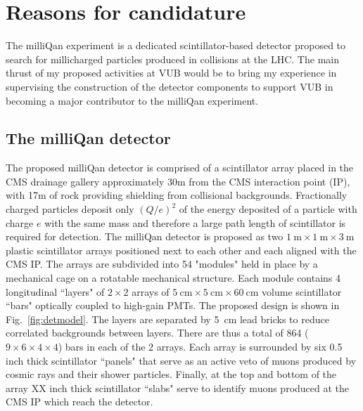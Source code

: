 \documentclass[11pt]{article}
\theoremstyle{plain} \numberwithin{equation}{section}
\theoremstyle{definition}
\begin{document}
\section*{Reasons for candidature}
\noindent 

The milliQan experiment is a dedicated scintillator-based detector
proposed to search for millicharged particles produced in collisions
at the LHC. The main thrust of my proposed activities at VUB 
would be to bring my experience in supervising the construction of the detector components
to support VUB in becoming a major contributor to the milliQan experiment.

\subsection*{The milliQan detector}

The proposed milliQan detector is comprised of a scintillator array placed in
the CMS drainage gallery approximately 30m from the CMS interaction point (IP), 
with 17m of rock providing shielding from collisional backgrounds. Fractionally charged particles 
deposit only $(Q/e)^2$ of the energy deposited of a particle with charge $e$ with 
the same mass and therefore a large path length of scintillator is required for
detection. The milliQan detector is proposed as two 
$1~\mathrm{m}\times1~\mathrm{m}\times3~\mathrm{m}$ plastic scintillator arrays 
positioned next to each other and each aligned with the CMS IP. The arrays are 
subdivided into 54 "modules" held in place by a mechanical cage on
a rotatable mechanical structure. Each module contains 4 longitudinal ``layers"
of $2\times2$ arrays of $5~\mathrm{cm}\times5~\mathrm{cm}\times60~\mathrm{cm}$ 
volume scintillator ``bars" optically coupled to high-gain PMTs. The 
proposed design is shown in Fig.~\ref{fig:detmodel}. The layers are 
separated by 5~cm lead bricks to reduce correlated backgrounds 
between layers. There are thus a total of 864 ($9\times6\times4\times4$) bars 
in each of the 2 arrays. Each array is surrounded by six 0.5 
inch thick scintillator ``panels" that serve as an active veto of muons produced 
by cosmic rays and their shower particles. Finally, at the top and bottom of the array
XX inch thick scintillator ``slabs" serve to identify muons produced at the CMS IP which
reach the detector. 
\end{document}
